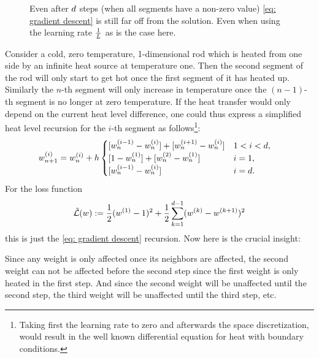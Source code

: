 \begin{figure}[h]
	\centering
	\def\svgwidth{1\textwidth}
	
	\caption{
		Even after \(d\) steps (when all segments have a non-zero value)
		\ref{eq: gradient descent} is still far off from the solution. Even when
		using the learning rate \(\tfrac1{L}\) as is the case here.
	}
	\label{fig: visualize coloring problem}
\end{figure}
%
Consider a cold, zero temperature, 1-dimensional rod which is heated from one side
by an infinite heat source at temperature one. Then the second segment of the rod
will only start to get hot once the first segment of it has heated up. Similarly
the \(n\)-th segment will only increase in temperature once the \((n-1)\)-th segment
is no longer at zero temperature. If the heat transfer would only depend on the
current heat level difference, one could thus express a simplified heat level
recursion for the \(i\)-th segment as follows\footnote{
	Taking first the learning rate to zero and afterwards the space discretization, would
	result in the well known differential equation for heat with boundary
	conditions.
}: 
%
\begin{align*}
	\weights_{n+1}^{(i)}
	&= \weights_{n}^{(i)}
	+ \lr 
	\begin{cases}
		[\weights_{n}^{(i-1)} - \weights_{n}^{(i)}] + [\weights_{n}^{(i+1)} - \weights_{n}^{(i)}]
		&  1 < i < \dimension, \\
		[1 - \weights_{n}^{(1)}] + [\weights_{n}^{(2)} - \weights_{n}^{(1)}]
		& i = 1, \\
		[\weights_{n}^{(i-1)} - \weights_{n}^{(i)}]
		& i = \dimension.
	\end{cases}
\end{align*}
%
For the loss function
%
\begin{align}\label{eq: naive complexity counterexample loss}
	\tilde{\mathcal{L}}(w)
	:= \frac12 (w^{(1)}-1)^2
	+ \frac12 \sum_{k=1}^{d-1} (w^{(k)}-w^{(k+1)})^2
\end{align}
%
this is just the \ref{eq: gradient descent} recursion. Now here is the crucial insight:

Since any weight is only affected once its neighbors are
affected, the second weight can not be affected before the second step since
the first weight is only heated in the first step. And since the second weight
will be unaffected until the second step, the third weight will be unaffected
until the third step, etc.

